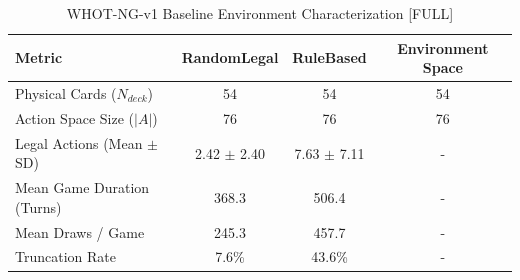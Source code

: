 \begin{table}[ht]
\centering
\caption{WHOT-NG-v1 Baseline Environment Characterization [FULL]}
\begin{tabular}{lccc}
\hline
Metric & RandomLegal & RuleBased & Environment Space \\
\hline
Physical Cards ($N_{deck}$) & 54 & 54 & 54 \\
Action Space Size ($|A|$) & 76 & 76 & 76 \\
Legal Actions (Mean $\pm$ SD) & 2.42 $\pm$ 2.40 & 7.63 $\pm$ 7.11 & - \\
Mean Game Duration (Turns) & 368.3 & 506.4 & - \\
Mean Draws / Game & 245.3 & 457.7 & - \\
Truncation Rate & 7.6\% & 43.6\% & - \\
\hline
\end{tabular}
\end{table}
